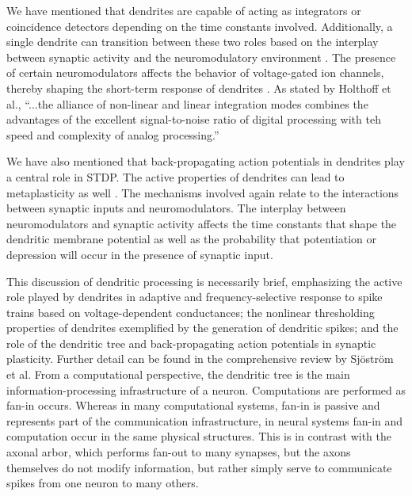 We have mentioned that dendrites are capable of acting as integrators or coincidence detectors depending on the time constants involved. Additionally, a single dendrite can transition between these two roles based on the interplay between synaptic activity and the neuromodulatory environment \cite{hoko2006}. The presence of certain neuromodulators affects the behavior of voltage-gated ion channels, thereby shaping the short-term response of dendrites \cite{majo2005}. As stated by Holthoff et al., ``...the alliance of non-linear and linear integration modes combines the advantages of the excellent signal-to-noise ratio of digital processing with teh speed and complexity of analog processing.'' \cite{hoko2006} 

We have also mentioned that back-propagating action potentials in dendrites play a central role in STDP. The active properties of dendrites can lead to metaplasticity as well \cite{ab2008}. The mechanisms involved again relate to the interactions between synaptic inputs and neuromodulators. The interplay between neuromodulators and synaptic activity affects the time constants that shape the dendritic membrane potential as well as the probability that potentiation or depression will occur in the presence of synaptic input. 

This discussion of dendritic processing is necessarily brief, emphasizing the active role played by dendrites in adaptive and frequency-selective response to spike trains based on voltage-dependent conductances; the nonlinear thresholding properties of dendrites exemplified by the generation of dendritic spikes; and the role of the dendritic tree and back-propagating action potentials in synaptic plasticity. Further detail can be found in the comprehensive review by Sj\"{o}str\"{o}m et al. \cite{sjra2008} From a computational perspective, the dendritic tree is the main information-processing infrastructure of a neuron. Computations are performed as fan-in occurs. Whereas in many computational systems, fan-in is passive and represents part of the communication infrastructure, in neural systems fan-in and computation occur in the same physical structures. This is in contrast with the axonal arbor, which performs fan-out to many synapses, but the axons themselves do not modify information, but rather simply serve to communicate spikes from one neuron to many others. 

